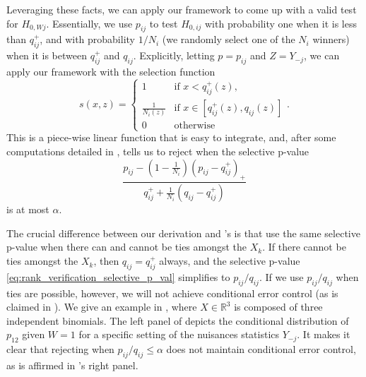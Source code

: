 \documentclass{article}
\newcommand{\R}{\mathbb{R}}
\begin{document}
Leveraging these facts, we can apply our framework to come up with a valid test for $H_{0, Wj}$. Essentially, we use $p_{ij}$ to test $H_{0, ij}$ with probability one when it is less than $q^+_{ij}$, and with probability $1/N_i$ (we randomly select one of the $N_i$ winners) when it is between $q^+_{ij}$ and $q_{ij}$. Explicitly, letting $p = p_{ij}$ and $Z = Y_{-j}$, we can apply our framework with the selection function
\begin{equation*}
    s(x, z) = 
    \begin{cases} 
    1 & \text{if } x < q_{ij}^+(z), \\
    \frac{1}{N_i(z)} & \text{if } x \in [q_{ij}^+(z), q_{ij}(z)] \\
    0 & \text{otherwise}
    \end{cases}.
\end{equation*}
This is a piece-wise linear function that is easy to integrate, and, after some computations detailed in ,  tells us to reject when the selective p-value
\begin{equation}
    \label{eq:rank_verification_selective_p_val}
     \frac{p_{ij} - \left(1 - \frac{1}{N_i} \right)(p_{ij} - q^+_{ij})_+ }{q^+_{ij} + \frac{1}{N_i}(q_{ij} - q^+_{ij}) }
\end{equation}
is at most $\alpha$. 

The crucial difference between our derivation and \cite{Hung2019}'s is that \cite{Hung2019} use the same selective p-value when there can and cannot be ties amongst the $X_k$. If there cannot be ties amongst the $X_k$, then $q_{ij} = q^{+}_{ij}$ always, and the selective p-value \eqref{eq:rank_verification_selective_p_val} simplifies to $p_{ij}/q_{ij}$. If we use $p_{ij}/q_{ij}$ when ties are possible, however, we will not achieve conditional error control (as is claimed in \cite{Hung2019}). We give an example in , where $X \in \R^3$ is composed of three independent binomials. The left panel of  depicts the conditional distribution of $p_{12}$ given $W=1$ for a specific setting of the nuisances statistics $Y_{-j}$. It makes it clear that rejecting when $p_{ij}/q_{ij} \leq \alpha $ does not maintain conditional error control, as is affirmed in 's right panel.
\end{document}
